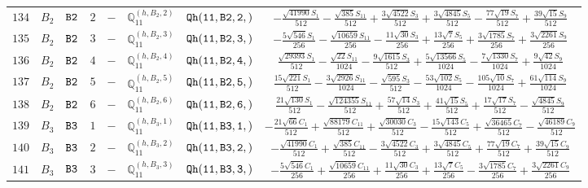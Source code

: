 \documentclass[fleqn,8pt]{jsarticle}
\begin{document}
\begin{table}[ht!]
\begin{center}
\begin{tabular}{cccccccc}
$ 134 $ & $ B_{2} $ & $ {\tt B2} $ & $ 2 $ & $ - $ & $ \mathbb{Q}_{11}^{(h,B_{2},2)} $ & $ {\tt Qh(11,B2,2,)} $ & $ - \frac{\sqrt{41990} S_{1}}{512} - \frac{\sqrt{385} S_{11}}{512} + \frac{3 \sqrt{4522} S_{3}}{512} + \frac{3 \sqrt{4845} S_{5}}{512} - \frac{77 \sqrt{19} S_{7}}{512} + \frac{39 \sqrt{15} S_{9}}{512} $ \\
$ 135 $ & $ B_{2} $ & $ {\tt B2} $ & $ 3 $ & $ - $ & $ \mathbb{Q}_{11}^{(h,B_{2},3)} $ & $ {\tt Qh(11,B2,3,)} $ & $ - \frac{5 \sqrt{546} S_{1}}{256} - \frac{\sqrt{10659} S_{11}}{256} - \frac{11 \sqrt{30} S_{3}}{256} + \frac{13 \sqrt{7} S_{5}}{256} + \frac{3 \sqrt{1785} S_{7}}{256} + \frac{3 \sqrt{2261} S_{9}}{256} $ \\
$ 136 $ & $ B_{2} $ & $ {\tt B2} $ & $ 4 $ & $ - $ & $ \mathbb{Q}_{11}^{(h,B_{2},4)} $ & $ {\tt Qh(11,B2,4,)} $ & $ \frac{\sqrt{29393} S_{1}}{512} - \frac{\sqrt{22} S_{11}}{1024} - \frac{9 \sqrt{1615} S_{3}}{512} + \frac{5 \sqrt{13566} S_{5}}{1024} - \frac{7 \sqrt{1330} S_{7}}{1024} + \frac{9 \sqrt{42} S_{9}}{1024} $ \\
$ 137 $ & $ B_{2} $ & $ {\tt B2} $ & $ 5 $ & $ - $ & $ \mathbb{Q}_{11}^{(h,B_{2},5)} $ & $ {\tt Qh(11,B2,5,)} $ & $ \frac{15 \sqrt{221} S_{1}}{512} - \frac{3 \sqrt{2926} S_{11}}{1024} - \frac{\sqrt{595} S_{3}}{512} - \frac{53 \sqrt{102} S_{5}}{1024} - \frac{105 \sqrt{10} S_{7}}{1024} + \frac{61 \sqrt{114} S_{9}}{1024} $ \\
$ 138 $ & $ B_{2} $ & $ {\tt B2} $ & $ 6 $ & $ - $ & $ \mathbb{Q}_{11}^{(h,B_{2},6)} $ & $ {\tt Qh(11,B2,6,)} $ & $ \frac{21 \sqrt{130} S_{1}}{512} - \frac{\sqrt{124355} S_{11}}{512} + \frac{57 \sqrt{14} S_{3}}{512} + \frac{41 \sqrt{15} S_{5}}{512} + \frac{17 \sqrt{17} S_{7}}{512} - \frac{\sqrt{4845} S_{9}}{512} $ \\
$ 139 $ & $ B_{3} $ & $ {\tt B3} $ & $ 1 $ & $ - $ & $ \mathbb{Q}_{11}^{(h,B_{3},1)} $ & $ {\tt Qh(11,B3,1,)} $ & $ - \frac{21 \sqrt{66} C_{1}}{512} + \frac{\sqrt{88179} C_{11}}{512} + \frac{\sqrt{30030} C_{3}}{512} - \frac{15 \sqrt{143} C_{5}}{512} + \frac{\sqrt{36465} C_{7}}{512} - \frac{\sqrt{46189} C_{9}}{512} $ \\
$ 140 $ & $ B_{3} $ & $ {\tt B3} $ & $ 2 $ & $ - $ & $ \mathbb{Q}_{11}^{(h,B_{3},2)} $ & $ {\tt Qh(11,B3,2,)} $ & $ - \frac{\sqrt{41990} C_{1}}{512} + \frac{\sqrt{385} C_{11}}{512} - \frac{3 \sqrt{4522} C_{3}}{512} + \frac{3 \sqrt{4845} C_{5}}{512} + \frac{77 \sqrt{19} C_{7}}{512} + \frac{39 \sqrt{15} C_{9}}{512} $ \\
$ 141 $ & $ B_{3} $ & $ {\tt B3} $ & $ 3 $ & $ - $ & $ \mathbb{Q}_{11}^{(h,B_{3},3)} $ & $ {\tt Qh(11,B3,3,)} $ & $ - \frac{5 \sqrt{546} C_{1}}{256} + \frac{\sqrt{10659} C_{11}}{256} + \frac{11 \sqrt{30} C_{3}}{256} + \frac{13 \sqrt{7} C_{5}}{256} - \frac{3 \sqrt{1785} C_{7}}{256} + \frac{3 \sqrt{2261} C_{9}}{256} $ \\

\end{tabular}
\end{center}
\end{table}
\end{document}
